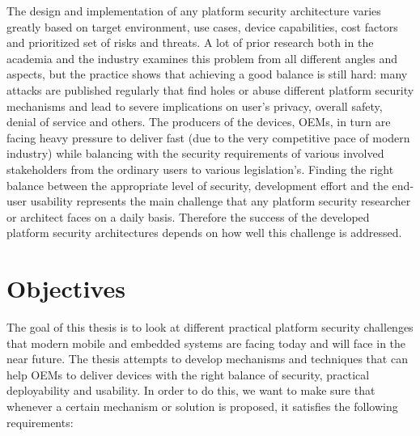 The design and implementation of any platform security architecture varies greatly based on target environment, use cases, device capabilities, cost factors and prioritized set of risks and threats. A lot of prior research both in the academia and the industry examines this problem from all different angles and aspects, but the practice shows that achieving a good balance is still hard: many attacks are published regularly that find holes or abuse different platform security mechanisms and lead to severe implications on user's privacy, overall safety, denial of service and others. The producers of the devices, OEMs, in turn are facing heavy pressure to deliver fast (due to the very competitive pace of modern industry) while balancing with the security requirements of various involved stakeholders from the ordinary users to various legislation’s. Finding the right balance between the appropriate level of security, development effort and the end-user usability represents the main challenge that any platform security researcher or architect faces on a daily basis. Therefore the success of the developed platform security architectures depends on how well this challenge is addressed.   

\section{Objectives}
\label{sec:Objectives}

The goal of this thesis is to look at different practical platform security challenges that modern mobile and embedded systems are facing today and will face in the near future. The thesis attempts to develop mechanisms and techniques that can help OEMs to deliver devices with the right balance of security, practical deployability and usability. In order to do this, we want to make sure that whenever a certain mechanism or solution is proposed, it satisfies the following requirements:

